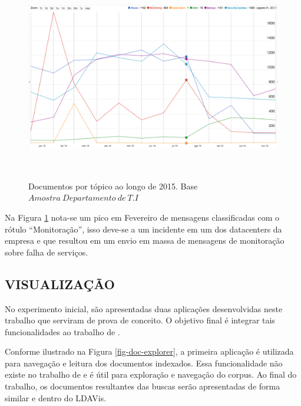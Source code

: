 \documentclass[12pt,a4paper]{article}
\begin{document}
\begin{figure}[H]
	\centering
    \includegraphics[height=9cm]{images/figure_7.png}
    \caption{Documentos por tópico ao longo de 2015. Base $Amostra\ Departamento\ de\ T.I$}
    \label{fig-documents-over-2015}
\end{figure}
 
Na Figura \ref{fig-documents-over-2015} nota-se um pico em Fevereiro de mensagens classificadas
 com o rótulo ``Monitoração'', isso deve-se a um incidente em um dos datacenters da empresa e que resultou em
 um envio em massa de mensagens de monitoração sobre falha de serviços.

\subsection{VISUALIZAÇÃO} \label{sec:visualizacao}

No experimento inicial, são apresentadas duas aplicações desenvolvidas neste trabalho que serviram de prova de conceito.
 O objetivo final é integrar tais funcionalidades ao trabalho de .

Conforme ilustrado na Figura \ref{fig-doc-explorer}, a primeira aplicação é utilizada para navegação e leitura dos documentos
 indexados. Essa funcionalidade não existe no trabalho de  e é útil para exploração e navegação do corpus.
 Ao final do trabalho, os documentos resultantes das buscas serão apresentadas de forma similar e dentro do LDAVis. 
\end{document}
